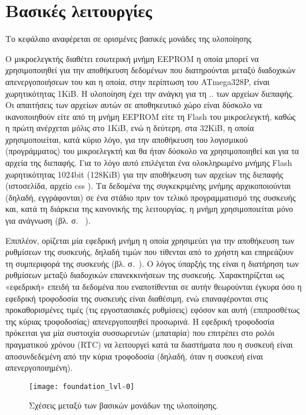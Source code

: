 \chapter{Βασικές λειτουργίες}
\label{ch:foundation}

Το κεφάλαιο αναφέρεται σε ορισμένες βασικές μονάδες της υλοποίησης

Ο μικροελεγκτής διαθέτει εσωτερική μνήμη EEPROM η οποία μπορεί να χρησιμοποιηθεί
για την αποθήκευση δεδομένων που διατηρούνται μεταξύ διαδοχικών απενεργοποιήσεων
του και η οποία, στην περίπτωση του ATmega328P, είναι χωρητικότητας 1KiB.
Η υλοποίηση έχει την ανάγκη για τη .. των αρχείων διεπαφής.
Οι απαιτήσεις των αρχείων αυτών σε αποθηκευτικό χώρο είναι δύσκολο να
ικανοποιηθούν είτε από τη μνήμη EEPROM είτε τη Flash του μικροελεγκτή, καθώς η
πρώτη ανέρχεται μόλις στο 1KiB, ενώ η δεύτερη, στα 32KiB, η οποία
χρησιμοποιείται, κατά κύριο λόγο, για την αποθήκευση του λογισμικού
(προγράμματος) του μικροελεγκτή και θα ήταν δύσκολο να χρησιμοποιηθεί και για
τα αρχεία της διεπαφής.
Για το λόγο αυτό επιλέγεται ένα ολοκληρωμένο μνήμης Flash χωρητικότητας 1024bit
(128KiB) για την αποθήκευση των αρχείων της διεπαφής (ιστοσελίδα, αρχείο
css ). Τα δεδομένα της συγκεκριμένης μνήμης αρχικοποιούνται (δηλαδή,
εγγράφονται) σε ένα στάδιο πριν τον τελικό προγραμματισμό της συσκευής και, κατά
τη διάρκεια της κανονικής της λειτουργίας, η μνήμη χρησιμοποιείται μόνο για
ανάγνωση (βλ.  σ.~%
\pageref{subsec:external-memory}).

Επιπλέον, ορίζεται μία εφεδρική μνήμη η οποία χρησιμεύει για την αποθήκευση των
ρυθμίσεων της συσκευής, δηλαδή τιμών που τίθενται από το χρήστη και επηρεάζουν
τη συμπεριφορά της συσκευής (βλ. σ.~\pageref{subsec:backup-memory}). Ο λόγος
ύπαρξής της είναι η διατήρηση των ρυθμίσεων μεταξύ διαδοχικών επανεκκινήσεων της
συσκευής. Χαρακτηρίζεται ως «εφεδρική» επειδή τα δεδομένα που εναποτίθενται σε
αυτήν θεωρούνται έγκυρα όσο η εφεδρική τροφοδοσία της συσκευής είναι διαθέσιμη,
ενώ επαναφέρονται στις προκαθορισμένες τιμές (τις εργοστασιακές ρυθμίσεις)
εφόσον και αυτή (επιπροσθέτως της κύριας τροφοδοσίας) απενεργοποιηθεί προσωρινά.
Η εφεδρική τροφοδοσία πρόκειται για μία συστοιχία συσσωρευτών (μπαταρία) που
επιτρέπει στο ρολόι πραγματικού χρόνου (RTC) να λειτουργεί κατά τα διαστήματα
που η συσκευή είναι αποσυνδεδεμένη από την κύρια τροφοδοσία (δηλαδή, όταν η
συσκευή είναι απενεργοποιημένη).
\begin{figure}
    \caption{Σχέσεις μεταξύ των βασικών μονάδων της υλοποίησης.
    \label{fig:foundation:lvl-0}}
    \begin{center}
    \texttt{[image: foundation\_lvl-0]}
    \end{center}
\end{figure}

